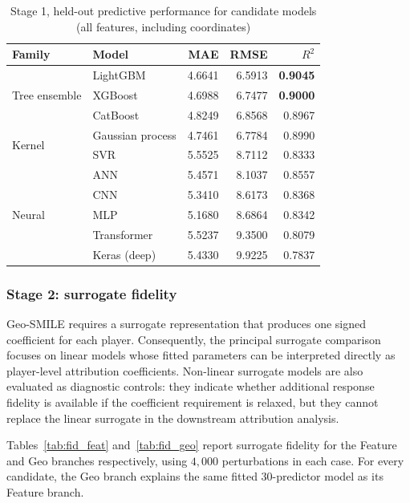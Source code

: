 \begin{table}[H]
\centering
\caption{Stage 1, held-out predictive performance for candidate models (all features, including coordinates)}
\label{tab:sel_pred}
\small
\begin{tabular}{llrrr}
\toprule
Family & Model & MAE & RMSE & $R^2$ \\
\midrule
\multirow{3}{*}{Tree ensemble}
 & LightGBM          & 4.6641 & 6.5913 & \textbf{0.9045} \\
 & XGBoost           & 4.6988 & 6.7477 & \textbf{0.9000} \\
 & CatBoost          & 4.8249 & 6.8568 & 0.8967 \\
\midrule
\multirow{2}{*}{Kernel}
 & Gaussian process  & 4.7461 & 6.7784 & 0.8990 \\
 & SVR               & 5.5525 & 8.7112 & 0.8333 \\
\midrule
\multirow{5}{*}{Neural}
 & ANN               & 5.4571 & 8.1037 & 0.8557 \\
 & CNN               & 5.3410 & 8.6173 & 0.8368 \\
 & MLP               & 5.1680 & 8.6864 & 0.8342 \\
 & Transformer       & 5.5237 & 9.3500 & 0.8079 \\
 & Keras (deep)      & 5.4330 & 9.9225 & 0.7837 \\
\bottomrule
\end{tabular}
\end{table}

\subsubsection{Stage 2: surrogate fidelity}
\label{sec}

Geo-SMILE requires a surrogate representation that produces one signed coefficient for each player. Consequently, the principal surrogate comparison focuses on linear models whose fitted parameters can be interpreted directly as player-level attribution coefficients. Non-linear surrogate models are also evaluated as diagnostic controls: they indicate whether additional response fidelity is available if the coefficient requirement is relaxed, but they cannot replace the linear surrogate in the downstream attribution analysis.

Tables~\ref{tab:fid_feat} and~\ref{tab:fid_geo} report surrogate fidelity for the Feature and Geo branches respectively, using $4{,}000$ perturbations in each case. For every candidate, the Geo branch explains the same fitted 30-predictor model as its Feature branch.

